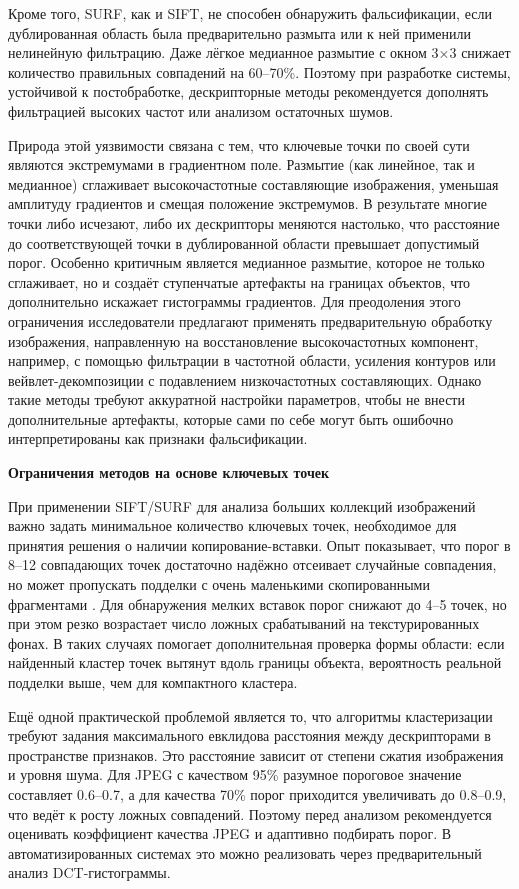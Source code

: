 Кроме того, SURF, как и SIFT, не способен обнаружить фальсификации, если дублированная область была предварительно размыта или к ней применили нелинейную фильтрацию. Даже лёгкое медианное размытие с окном 3×3 снижает количество правильных совпадений на 60–70\%. Поэтому при разработке системы, устойчивой к постобработке, дескрипторные методы рекомендуется дополнять фильтрацией высоких частот или анализом остаточных шумов.

Природа этой уязвимости связана с тем, что ключевые точки по своей сути являются экстремумами в градиентном поле. Размытие (как линейное, так и медианное) сглаживает высокочастотные составляющие изображения, уменьшая амплитуду градиентов и смещая положение экстремумов. В результате многие точки либо исчезают, либо их дескрипторы меняются настолько, что расстояние до соответствующей точки в дублированной области превышает допустимый порог. Особенно критичным является медианное размытие, которое не только сглаживает, но и создаёт ступенчатые артефакты на границах объектов, что дополнительно искажает гистограммы градиентов. Для преодоления этого ограничения исследователи предлагают применять предварительную обработку изображения, направленную на восстановление высокочастотных компонент, например, с помощью фильтрации в частотной области, усиления контуров или вейвлет-декомпозиции с подавлением низкочастотных составляющих. Однако такие методы требуют аккуратной настройки параметров, чтобы не внести дополнительные артефакты, которые сами по себе могут быть ошибочно интерпретированы как признаки фальсификации.

\textbf{Ограничения методов на основе ключевых точек}

При применении SIFT/SURF для анализа больших коллекций изображений важно задать минимальное количество ключевых точек, необходимое для принятия решения о наличии копирование-вставки. Опыт показывает, что порог в 8–12 совпадающих точек достаточно надёжно отсеивает случайные совпадения, но может пропускать подделки с очень маленькими скопированными фрагментами \cite{15}. Для обнаружения мелких вставок порог снижают до 4–5 точек, но при этом резко возрастает число ложных срабатываний на текстурированных фонах. В таких случаях помогает дополнительная проверка формы области: если найденный кластер точек вытянут вдоль границы объекта, вероятность реальной подделки выше, чем для компактного кластера.

Ещё одной практической проблемой является то, что алгоритмы кластеризации требуют задания максимального евклидова расстояния между дескрипторами в пространстве признаков. Это расстояние зависит от степени сжатия изображения и уровня шума. Для JPEG с качеством 95\% разумное пороговое значение составляет 0.6–0.7, а для качества 70\% порог приходится увеличивать до 0.8–0.9, что ведёт к росту ложных совпадений. Поэтому перед анализом рекомендуется оценивать коэффициент качества JPEG и адаптивно подбирать порог. В автоматизированных системах это можно реализовать через предварительный анализ DCT-гистограммы.

